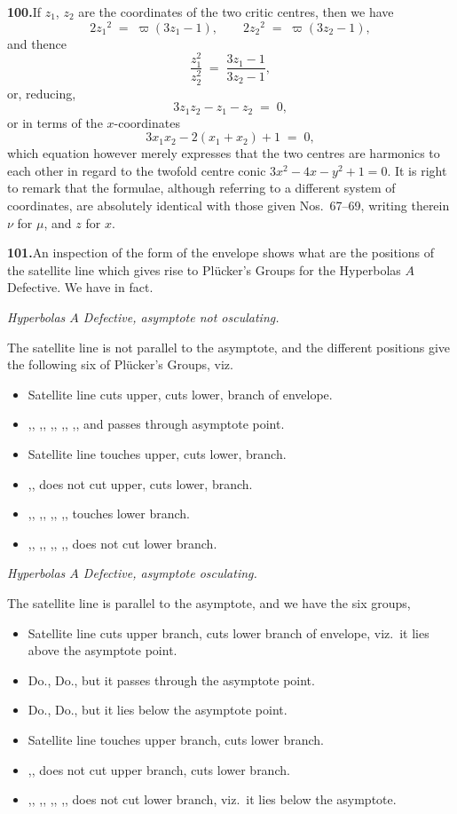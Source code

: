 \documentclass[11pt]{article}
\begin{document}
\medskip
\textbf{100.}\quad If $z_{1}$, $z_{2}$ are the coordinates of the two critic centres, then we have
\[
2 z_{1}{}^{2} \;=\; \varpi(3 z_{1} - 1),\qquad 2 z_{2}{}^{2} \;=\; \varpi(3 z_{2} - 1),
\]
and thence
\[
\frac{z_{1}^{2}}{z_{2}^{2}} \;=\; \frac{3 z_{1} - 1}{3 z_{2} - 1},
\]
or, reducing,
\[
3 z_{1} z_{2} - z_{1} - z_{2} \;=\; 0,
\]
or in terms of the $x$-coordinates
\[
3 x_{1} x_{2} - 2(x_{1} + x_{2}) + 1 \;=\; 0,
\]
which equation however merely expresses that the two centres are harmonics to each other in regard to the twofold centre conic $3 x^{2} - 4 x - y^{2} + 1 = 0$. It is right to remark that the formulae, although referring to a different system of coordinates, are absolutely identical with those given Nos.\ 67--69, writing therein $\nu$ for $\mu$, and $z$ for $x$.

\medskip
\textbf{101.}\quad An inspection of the form of the envelope shows what are the positions of the satellite line which gives rise to Pl\"ucker's Groups for the Hyperbolas $A$ Defective. We have in fact.
\smallskip

\noindent\emph{Hyperbolas $A$ Defective, asymptote not osculating.}

The satellite line is not parallel to the asymptote, and the different positions give the following six of Pl\"ucker's Groups, viz.
\begin{itemize}\itemsep0pt
\item[XVIII.] Satellite line cuts upper, cuts lower, branch of envelope.
\item[XX.] ,, ,, ,, ,, ,, and passes through asymptote point.
\item[XIX.] Satellite line touches upper, cuts lower, branch.
\item[XXI.] ,, does not cut upper, cuts lower, branch.
\item[XXIII.] ,, ,, ,, ,, touches lower branch.
\item[XXII.] ,, ,, ,, ,, does not cut lower branch.
\end{itemize}

\noindent\emph{Hyperbolas $A$ Defective, asymptote osculating.}

The satellite line is parallel to the asymptote, and we have the six groups,
\begin{itemize}\itemsep0pt
\item[XXVIII.] Satellite line cuts upper branch, cuts lower branch of envelope, viz.\ it lies above the asymptote point.
\item[XXIX.] Do., Do., but it passes through the asymptote point.
\item[XXX.] Do., Do., but it lies below the asymptote point.
\item[XXXI.] Satellite line touches upper branch, cuts lower branch.
\item[XXXII.] ,, does not cut upper branch, cuts lower branch.
\item[XXXIII.] ,, ,, ,, ,, does not cut lower branch, viz.\ it lies below the asymptote.
\end{itemize}
\end{document}
